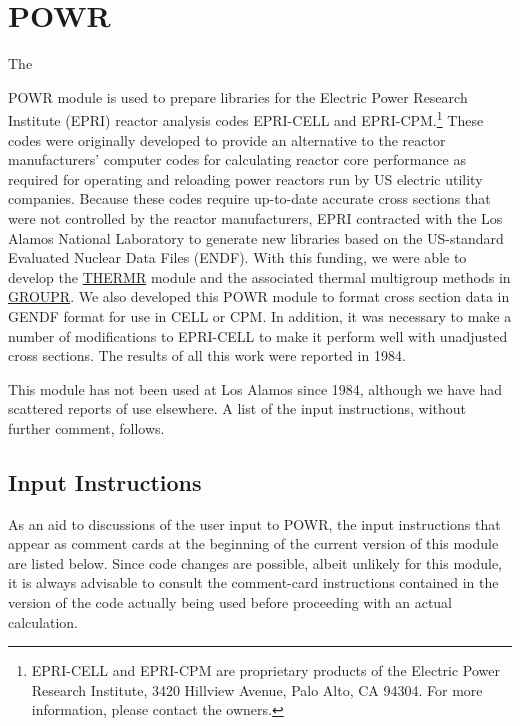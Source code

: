\section{POWR}
\label{sPOWR}

\hypertarget{sPOWRhy}{The}
POWR module is used to prepare libraries for the Electric
Power Research Institute (EPRI) reactor analysis codes
EPRI-CELL and EPRI-CPM.\footnote{EPRI-CELL and EPRI-CPM are
proprietary products of the Electric Power Research Institute,
3420 Hillview Avenue, Palo Alto, CA 94304.  For more information,
please contact the owners.}
These codes were originally developed to provide an alternative
to the reactor manufacturers'
computer codes for calculating reactor core performance as
required for operating and reloading power reactors run by
US electric utility companies.  Because these codes require
up-to-date accurate cross sections that were not controlled
by the reactor manufacturers, EPRI contracted with the Los
Alamos National Laboratory to generate new libraries based on
the US-standard Evaluated Nuclear Data Files (ENDF).  With this
funding, we were able to develop the
\hyperlink{sTHERMRhy}{THERMR} module and the
associated thermal multigroup methods in
\hyperlink{sGROUPRhy}{GROUPR}.  We also
developed this POWR module to format cross section data in
GENDF format for use in CELL or CPM.  In addition, it was necessary
to make a number of modifications to EPRI-CELL to make it perform
well with unadjusted cross sections.  The results of all this
work were reported in 1984\cite{powr}.

This module has not been used at Los Alamos since 1984,
although we have had scattered reports of use elsewhere.  A list of
the input instructions, without further comment, follows.


\subsection{Input Instructions}
\label{ssPOWR_inp}

As an aid to discussions of the user input to POWR, the input
instructions that appear as comment cards at the beginning of the
current version of this module are listed below.  Since code changes
are possible, albeit unlikely for this module, it is always advisable
to consult the comment-card instructions contained in the version of
the code actually being used before proceeding with an actual calculation.


